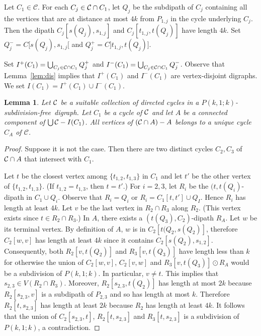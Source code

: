 \documentclass[utf8,11pt]{article}
\theoremstyle{plain}
\newtheorem{lemma}[theorem]{Lemma}
\theoremstyle{definition}
\theoremstyle{remark}
\newcommand{\free}{subdivision-free}
\begin{document}
Let $C_1\in \mathcal{C}$.
For each $C_j\in {\cal C} \cap C_1$, let $Q_j$ be the subdipath of $C_j$ 
containing all the vertices that are at distance at most $4k$ from $P_{1,j}$ in the cycle underlying $C_j$.
Then the dipath $C_j[s(Q_j), s_{1,j}]$ and  $C_j[t_{1,j},t (Q_j)]$ have length $4k$.
Set $Q^-_j=C[s(Q_j), s_{1,j}[$ and $Q^+_j=C]t_{1,j}, t(Q_j)]$.


Set $I^+(C_1) = \bigcup_{C_j\in {\cal C}\cap C_1} Q^+_j$ and $I^-(C_1) = \bigcup_{C_j\in {\cal C}\cap C_1} Q^-_j$.
Observe that Lemma~\ref{lem:dis} implies that $I^+(C_1)$ and $I^-(C_1)$ are vertex-disjoint digraphs. We set $I(C_1)=I^+(C_1)\cup I^-(C_1)$.




\begin{lemma}\label{lem:A}
Let ${\cal C}$ be a suitable collection of directed cycles in a $P(k,1;k)$-\free\ digraph.
Let $C_1$ be a cycle of ${\cal C}$ and let $A$ be a connected component of $\bigcup{\cal C} - I(C_1)$.
All vertices of $({\cal C}\cap A)  - A$ belongs to a unique cycle $C_A$ of $\mathcal{C}$.
\end{lemma}

\begin{proof}
Suppose it is not the case. Then there are two distinct cycles $C_2, C_3$ of ${\cal C}\cap A$ that intersect with $C_1$.

Let $t$ be the closest vertex among $\{t_{1,2}, t_{1,3}\}$ in $C_1$ and let $t'$ be the other vertex of $\{t_{1,2}, t_{1,3}\}$.
(If $t_{1,2}=t_{1,3}$, then $t=t'$.) For $i=2,3$, let $R_i$ be the $(t,t(Q_i)$-dipath in $C_1\cup Q_i$. Observe that $R_i=Q_i$ or $R_i=C_1[t,t']\cup Q_I$. Hence $R_i$ has length at least $4k$.
Let $v$ be the last vertex in $R_2\cap R_3$ along $R_2$. (This vertex exists since $t\in R_2\cap R_3$.) In $A$, there exists a $(t(Q_3), C_2)$-dipath $R_A$. Let $w$ be its terminal vertex. By definition of $A$, $w$ is in $C_2[t(Q_2, s(Q_2)]$, therefore $C_2[w,v]$ has length at least $4k$ since it contains $C_2[s(Q_2), s_{1,2}]$. Consequently, both $R_2[v,t(Q_2)]$ and $R_3[v,t(Q_3)]$ have length less than $k$ for otherwise the union of $C_2[w,v]$, $C_2[v,w]$ and $R_3[v,t(Q_3)]\odot R_A$ would be a subdivision of $P(k,1;k)$.
In particular, $v\neq t$. This implies that $s_{2,3}\in V(R_2\cap R_3)$.
Moreover, $R_2[s_{2,3}, t(Q_2)]$ has length at most $2k$ because $R_2[s_{2,3},v]$ is a subdipath of $P_{2,3}$ and so has length at most $k$.
Therefore $R_2[t,s_{2,3}]$ has length at least $2k$ because $R_2$ has length at least $4k$.
It follows that the union of $C_2[s_{2,3},t]$,  $R_2[t,s_{2,3}]$ and  $R_3[t,s_{2,3}]$ is a subdivision of $P(k,1;k)$, a contradiction.
\end{proof}
\end{document}
